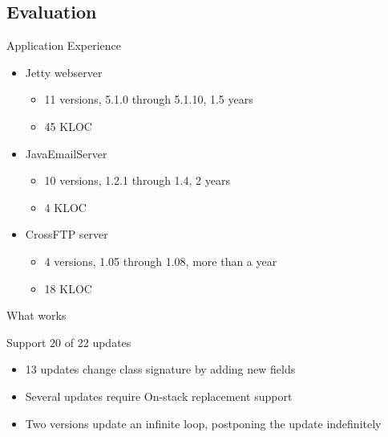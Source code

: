 
\subsection{Evaluation}
\ShowTOC

\newcommand{\HighlightRow}{\rowcolor{structure.fg!30}}

\begin{frame}{Application Experience}%
\begin{itemize}
\item Jetty webserver
  \begin{itemize}
  \item 11 versions, 5.1.0 through 5.1.10, 1.5 years
  \item 45 KLOC
  \end{itemize}
\item JavaEmailServer
  \begin{itemize}
  \item 10 versions, 1.2.1 through 1.4, 2 years
  \item 4 KLOC
  \end{itemize}
\item CrossFTP server
  \begin{itemize}
  \item 4 versions, 1.05 through 1.08, more than a year
  \item 18 KLOC
  \end{itemize}
\end{itemize}
\end{frame}

\begin{frame}{What works}%
\begin{center}
{\Large Support 20 of 22 updates}
\end{center}
\vspace{2ex}
\begin{itemize}
\item 13 updates change class signature by adding new fields
\item Several updates require On-stack replacement support
\item Two versions update an infinite loop, postponing the update
indefinitely
\end{itemize}
\end{frame}

